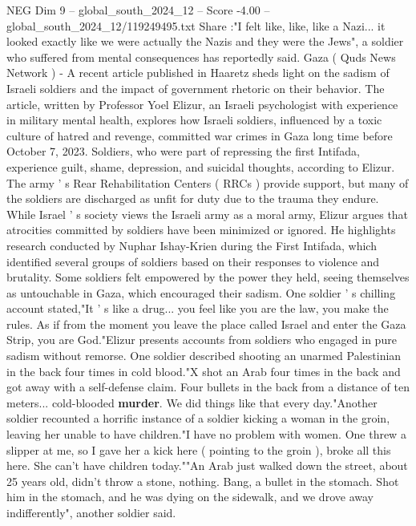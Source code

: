 \begin{textsample}{NEG Dim 9 – global\_south\_2024\_12 – Score -4.00 – global\_south\_2024\_12/119249495.txt}  \label{ex:f9_neg_216}
Share :"I felt like, like, like a Nazi... it looked exactly like we were actually the Nazis and they were the Jews", a soldier who suffered from mental consequences has reportedly said.
Gaza ( Quds News Network ) - A recent article published in Haaretz sheds light on the sadism of Israeli soldiers and the impact of government rhetoric on their behavior.
The article, written by Professor Yoel Elizur, an Israeli psychologist with experience in military mental health, explores how Israeli soldiers, influenced by a toxic culture of hatred and revenge, committed war crimes in Gaza long time before October 7, 2023.
Soldiers, who were part of repressing the first Intifada, experience guilt, shame, depression, and suicidal thoughts, according to Elizur.
The army ' s Rear Rehabilitation Centers ( RRCs ) provide support, but many of the soldiers are discharged as unfit for duty due to the trauma they endure.
While Israel ' s society views the Israeli army as a moral army, Elizur argues that atrocities committed by soldiers have been minimized or ignored.
He highlights research conducted by Nuphar Ishay-Krien during the First Intifada, which identified several groups of soldiers based on their responses to violence and brutality.
Some soldiers felt empowered by the power they held, seeing themselves as untouchable in Gaza, which encouraged their sadism.
One soldier ' s chilling account stated,"It ' s like a drug... you feel like you are the law, you make the rules.
As if from the moment you leave the place called Israel and enter the Gaza Strip, you are God."Elizur presents accounts from soldiers who engaged in pure sadism without remorse.
One soldier described shooting an unarmed Palestinian in the back four times in cold blood."X shot an Arab four times in the back and got away with a self-defense claim.
Four bullets in the back from a distance of ten meters... cold-blooded \textbf{murder}.
We did things like that every day."Another soldier recounted a horrific instance of a soldier kicking a woman in the groin, leaving her unable to have children."I have no problem with women.
One threw a slipper at me, so I gave her a kick here ( pointing to the groin ), broke all this here.
She can't have children today.""An Arab just walked down the street, about 25 years old, didn't throw a stone, nothing.
Bang, a bullet in the stomach.
Shot him in the stomach, and he was dying on the sidewalk, and we drove away indifferently", another soldier said.

\end{textsample}
